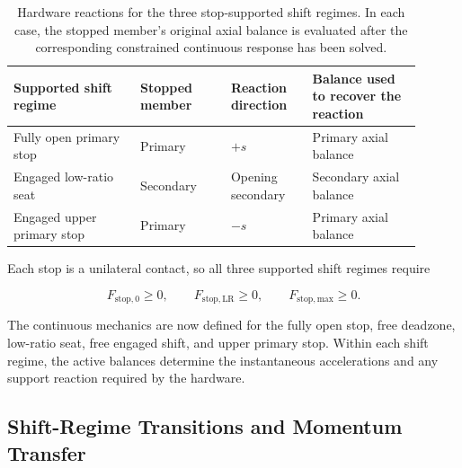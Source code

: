 \documentclass[11pt]{report}
\numberwithin{equation}{section}
\begin{document}
\begin{table}[H]
    \centering
    \small
    \renewcommand{\arraystretch}{1.18}
    \begin{tabular}{@{}
        >{\raggedright\arraybackslash}p{0.28\linewidth}
        >{\raggedright\arraybackslash}p{0.20\linewidth}
        >{\raggedright\arraybackslash}p{0.18\linewidth}
        >{\raggedright\arraybackslash}p{0.24\linewidth}
        @{}}
        \toprule
        \textbf{Supported shift regime}
        & \textbf{Stopped member}
        & \textbf{Reaction direction}
        & \textbf{Balance used to recover the reaction}
        \\
        \midrule
        Fully open primary stop
        & Primary
        & \(+s\)
        & Primary axial balance
        \\[4pt]
        Engaged low-ratio seat
        & Secondary
        & Opening secondary
        & Secondary axial balance
        \\[4pt]
        Engaged upper primary stop
        & Primary
        & \(-s\)
        & Primary axial balance
        \\
        \bottomrule
    \end{tabular}
    \caption{Hardware reactions for the three stop-supported shift regimes.
    In each case, the stopped member's original axial balance is evaluated
    after the corresponding constrained continuous response has been solved.}
    \label{tab:structural_stop_reactions}
\end{table}

Each stop is a unilateral contact, so all three supported shift regimes
require

\begin{equation}
    F_{\mathrm{stop},0}\geq0,
    \qquad
    F_{\mathrm{stop,LR}}\geq0,
    \qquad
    F_{\mathrm{stop,max}}\geq0.
    \label{eq:structural_stop_admissibility}
\end{equation}

The continuous mechanics are now defined for the fully open stop, free
deadzone, low-ratio seat, free engaged shift, and upper primary stop. Within
each shift regime, the active balances determine the instantaneous
accelerations and any support reaction required by the hardware.

\subsection{Shift-Regime Transitions and Momentum Transfer}
\label{sec:shift_regime_transitions}
\end{document}
